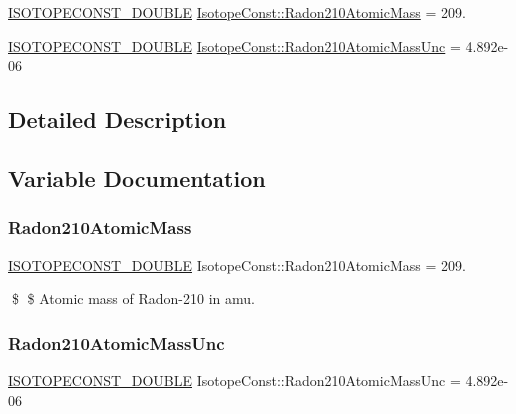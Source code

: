 \begin{DoxyCompactItemize}
\item 
\mbox{\hyperlink{group___isotope_const-_macros_ga8f45a7272ce02c0b4c65c44636ed719a}{I\+S\+O\+T\+O\+P\+E\+C\+O\+N\+S\+T\+\_\+\+D\+O\+U\+B\+LE}} \mbox{\hyperlink{group___isotope_const-_radon-_rn210_ga9c37b401be6687ed464419981f6a5d7f}{Isotope\+Const\+::\+Radon210\+Atomic\+Mass}} = 209.
\item 
\mbox{\hyperlink{group___isotope_const-_macros_ga8f45a7272ce02c0b4c65c44636ed719a}{I\+S\+O\+T\+O\+P\+E\+C\+O\+N\+S\+T\+\_\+\+D\+O\+U\+B\+LE}} \mbox{\hyperlink{group___isotope_const-_radon-_rn210_ga90cba4fb93238c40dc0b91a79f8276ae}{Isotope\+Const\+::\+Radon210\+Atomic\+Mass\+Unc}} = 4.\+892e-\/06
\end{DoxyCompactItemize}


\subsection{Detailed Description}


\subsection{Variable Documentation}
\mbox{\label{group___isotope_const-_radon-_rn210_ga9c37b401be6687ed464419981f6a5d7f}} 
\subsubsection{\texorpdfstring{Radon210\+Atomic\+Mass}{Radon210AtomicMass}}
{\footnotesize\ttfamily \mbox{\hyperlink{group___isotope_const-_macros_ga8f45a7272ce02c0b4c65c44636ed719a}{I\+S\+O\+T\+O\+P\+E\+C\+O\+N\+S\+T\+\_\+\+D\+O\+U\+B\+LE}} Isotope\+Const\+::\+Radon210\+Atomic\+Mass = 209.}

\$ \$ Atomic mass of Radon-\/210 in amu. \mbox{\label{group___isotope_const-_radon-_rn210_ga90cba4fb93238c40dc0b91a79f8276ae}} 
\subsubsection{\texorpdfstring{Radon210\+Atomic\+Mass\+Unc}{Radon210AtomicMassUnc}}
{\footnotesize\ttfamily \mbox{\hyperlink{group___isotope_const-_macros_ga8f45a7272ce02c0b4c65c44636ed719a}{I\+S\+O\+T\+O\+P\+E\+C\+O\+N\+S\+T\+\_\+\+D\+O\+U\+B\+LE}} Isotope\+Const\+::\+Radon210\+Atomic\+Mass\+Unc = 4.\+892e-\/06}

